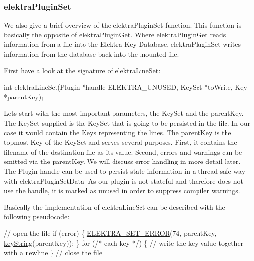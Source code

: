 \subsubsection*{{\ttfamily elektra\+Plugin\+Set}}

We also give a brief overview of the {\ttfamily elektra\+Plugin\+Set} function. This function is basically the opposite of {\ttfamily elektra\+Plugin\+Get}. Where {\ttfamily elektra\+Plugin\+Get} reads information from a file into the Elektra Key Database, {\ttfamily elektra\+Plugin\+Set} writes information from the database back into the mounted file.

First have a look at the signature of {\ttfamily elektra\+Line\+Set}\+:


\begin{DoxyCode}
\textcolor{keywordtype}{int} elektraLineSet(Plugin *handle ELEKTRA\_UNUSED, KeySet *toWrite, Key *parentKey);
\end{DoxyCode}


Lets start with the most important parameters, the {\ttfamily Key\+Set} and the {\ttfamily parent\+Key}. The {\ttfamily Key\+Set} supplied is the {\ttfamily Key\+Set} that is going to be persisted in the file. In our case it would contain the Keys representing the lines. The {\ttfamily parent\+Key} is the topmost {\ttfamily Key} of the {\ttfamily Key\+Set} and serves several purposes. First, it contains the filename of the destination file as its value. Second, errors and warnings can be emitted via the {\ttfamily parent\+Key}. We will discuss error handling in more detail later. The Plugin handle can be used to persist state information in a thread-\/safe way with {\ttfamily elektra\+Plugin\+Set\+Data}. As our plugin is not stateful and therefore does not use the handle, it is marked as unused in order to suppress compiler warnings.

Basically the implementation of {\ttfamily elektra\+Line\+Set} can be described with the following pseudocode\+:


\begin{DoxyCode}
\textcolor{comment}{// open the file}
\textcolor{keywordflow}{if} (error)
\{
        \hyperlink{group__plugin_gaab1842b82272e6d4235b6a71587a64d9}{ELEKTRA\_SET\_ERROR}(74, parentKey, \hyperlink{group__keyvalue_ga880936f2481d28e6e2acbe7486a21d05}{keyString}(parentKey));
\}
\textcolor{keywordflow}{for} (\textcolor{comment}{/* each key */})
\{
        \textcolor{comment}{// write the key value together with a newline}
\}
\textcolor{comment}{// close the file}
\end{DoxyCode}


